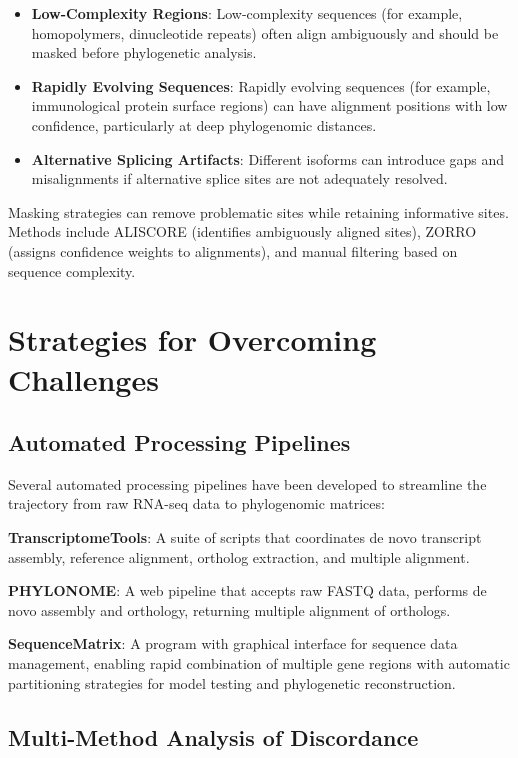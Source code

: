 \begin{itemize}
\item \textbf{Low-Complexity Regions}: Low-complexity sequences (for example, homopolymers, dinucleotide repeats) often align ambiguously and should be masked before phylogenetic analysis.

\item \textbf{Rapidly Evolving Sequences}: Rapidly evolving sequences (for example, immunological protein surface regions) can have alignment positions with low confidence, particularly at deep phylogenomic distances.

\item \textbf{Alternative Splicing Artifacts}: Different isoforms can introduce gaps and misalignments if alternative splice sites are not adequately resolved.
\end{itemize}

Masking strategies can remove problematic sites while retaining informative sites. Methods include ALISCORE (identifies ambiguously aligned sites), ZORRO (assigns confidence weights to alignments), and manual filtering based on sequence complexity.

\section{Strategies for Overcoming Challenges}

\subsection{Automated Processing Pipelines}

Several automated processing pipelines have been developed to streamline the trajectory from raw RNA-seq data to phylogenomic matrices:

\textbf{TranscriptomeTools}: A suite of scripts that coordinates de novo transcript assembly, reference alignment, ortholog extraction, and multiple alignment.

\textbf{PHYLONOME}: A web pipeline that accepts raw FASTQ data, performs de novo assembly and orthology, returning multiple alignment of orthologs.

\textbf{SequenceMatrix}: A program with graphical interface for sequence data management, enabling rapid combination of multiple gene regions with automatic partitioning strategies for model testing and phylogenetic reconstruction.

\subsection{Multi-Method Analysis of Discordance}

